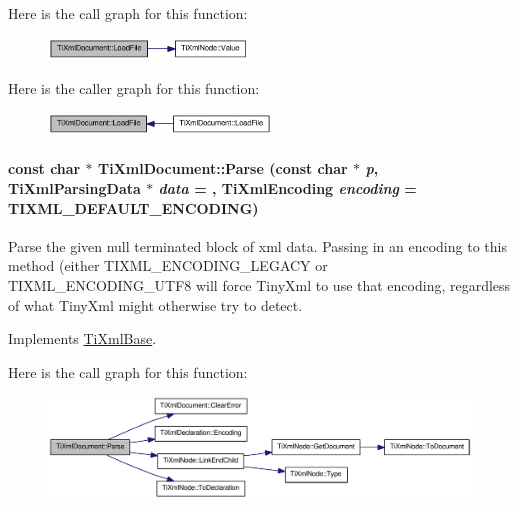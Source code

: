 Here is the call graph for this function:\nopagebreak
\begin{figure}[H]
\begin{center}
\leavevmode
\includegraphics[width=151pt]{class_ti_xml_document_a4c852a889c02cf251117fd1d9fe1845f_cgraph}
\end{center}
\end{figure}


Here is the caller graph for this function:\nopagebreak
\begin{figure}[H]
\begin{center}
\leavevmode
\includegraphics[width=168pt]{class_ti_xml_document_a4c852a889c02cf251117fd1d9fe1845f_icgraph}
\end{center}
\end{figure}
\hypertarget{class_ti_xml_document_a789ad2f06f93d52bdb5570b2f3670289}{
\paragraph[{Parse}]{\setlength{\rightskip}{0pt plus 5cm}const char $\ast$ TiXmlDocument::Parse (const char $\ast$ {\em p}, \/  {\bf TiXmlParsingData} $\ast$ {\em data} = {}, \/  TiXmlEncoding {\em encoding} = {\ttfamily TIXML\_\-DEFAULT\_\-ENCODING})}\hfill}
\label{class_ti_xml_document_a789ad2f06f93d52bdb5570b2f3670289}
Parse the given null terminated block of xml data. Passing in an encoding to this method (either TIXML\_\-ENCODING\_\-LEGACY or TIXML\_\-ENCODING\_\-UTF8 will force TinyXml to use that encoding, regardless of what TinyXml might otherwise try to detect. 

Implements \hyperlink{class_ti_xml_base}{TiXmlBase}.

Here is the call graph for this function:\nopagebreak
\begin{figure}[H]
\begin{center}
\leavevmode
\includegraphics[width=329pt]{class_ti_xml_document_a789ad2f06f93d52bdb5570b2f3670289_cgraph}
\end{center}
\end{figure}


